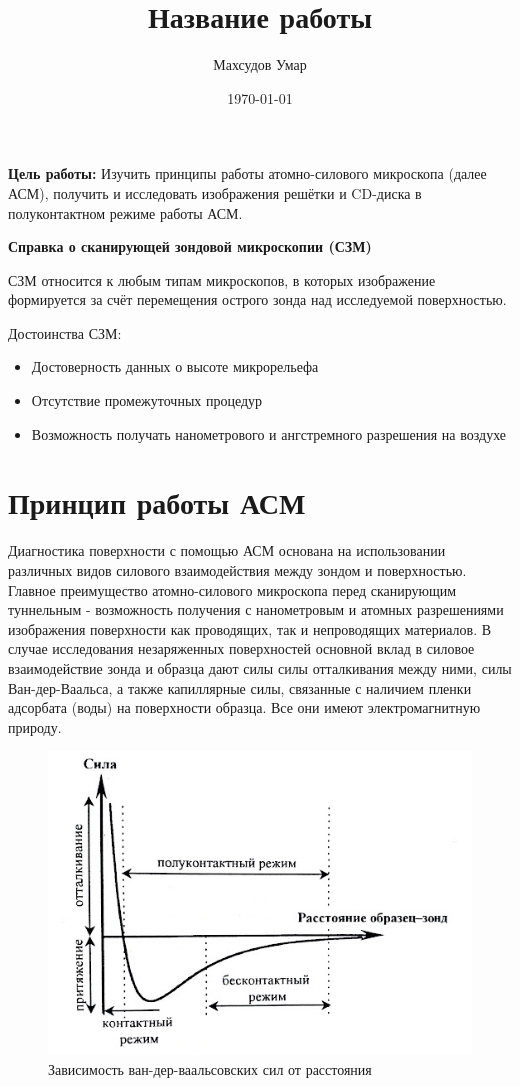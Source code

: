 \documentclass[a4paper,12pt]{article}
\author{Махсудов Умар}
\title{Название работы}
\date{\today}
\theoremstyle{plain} %
\theoremstyle{definition} %
\theoremstyle{remark} %
\begin{document}
\textbf{Цель работы:} Изучить принципы работы атомно-силового микроскопа (далее АСМ), получить и исследовать изображения решётки и CD-диска в полуконтактном режиме работы АСМ.

\textbf{Справка о сканирующей зондовой микроскопии (СЗМ)}


СЗМ относится к любым типам микроскопов, в которых изображение формируется за счёт перемещения острого зонда над исследуемой поверхностью.


Достоинства СЗМ:
\begin{itemize}
	\item
	Достоверность данных о высоте микрорельефа
	\item
	Отсутствие промежуточных процедур
	\item
	Возможность получать нанометрового и ангстремного разрешения на воздухе
\end{itemize}
\section{Принцип работы АСМ}
Диагностика поверхности с помощью АСМ основана на использовании различных видов силового взаимодействия между зондом и поверхностью. Главное преимущество атомно-силового микроскопа перед сканирующим туннельным - возможность получения с нанометровым и атомных разрешениями изображения поверхности как проводящих, так и непроводящих материалов. В случае исследования незаряженных поверхностей основной вклад в силовое взаимодействие зонда и образца дают силы силы отталкивания между ними, силы Ван-дер-Ваальса, а также капиллярные силы, связанные с наличием пленки адсорбата (воды) на поверхности образца. Все они имеют электромагнитную природу.
\begin{figure}[h!]
	\centering
	\includegraphics[scale=0.6]{pic1.jpg}
	\caption{Зависимость ван-дер-ваальсовских сил от расстояния}
	\label{pic1}
\end{figure}
\end{document}
